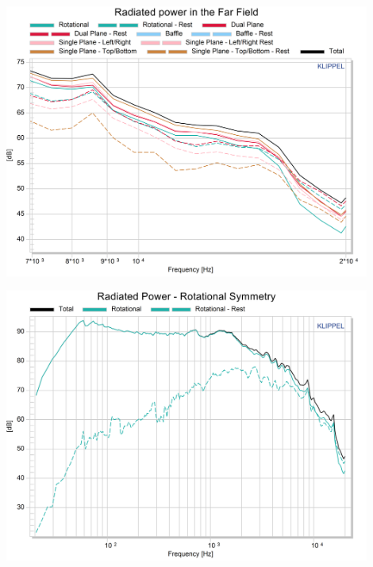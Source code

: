 \documentclass{report}
\begin{document}
\begin{appendices}
\begin{minipage}{0.5\textwidth}
\begin{center}
	\includegraphics[width=0.9\textwidth]{Appendix/Rad_Pow_Oval_ZoomHF}
    \captionsetup{hypcap=false}
    \label{Curves:oval_zoom}
\end{center}
\end{minipage}
\begin{minipage}{0.5\textwidth}
\begin{center}
	\includegraphics[width=0.9\textwidth]{Sym/Oval_RadPow_Rot}
    \captionsetup{hypcap=false}
\end{center}
\end{minipage}


\end{appendices}
\end{document}
